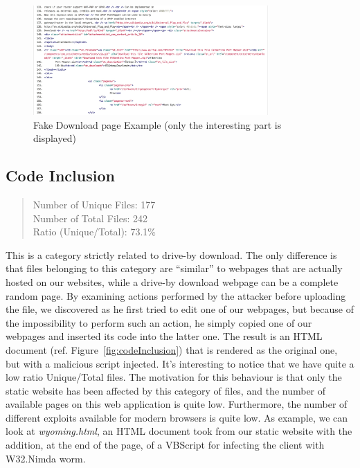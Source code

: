 \begin{figure}[H]
\centerline{\includegraphics[width=0.8\textwidth]{Images/fakeDownload.jpg}}
\caption{Fake Download page Example (only the interesting part is displayed)\label{fig:fakeDownload}}
\end{figure}

\subsection{Code Inclusion}

\begin{quote}
Number of Unique Files: 177\\
Number of Total Files: 242\\
Ratio (Unique/Total): 73.1\%
\end{quote}

This is a category strictly related to drive-by download. The only difference is that files belonging to this category are ``similar'' to webpages that are actually hosted on our websites, while a drive-by download webpage can be a complete random page. By examining actions performed by the attacker before uploading the file, we discovered as he first tried to edit one of our webpages, but because of the impossibility to perform such an action, he simply copied one of our webpages and inserted its code into the latter one. The result is an HTML document (ref. Figure~\ref{fig:codeInclusion}) that is rendered as the original one, but with a malicious script injected. It's interesting to notice that we have quite a low ratio Unique/Total files. The motivation for this behaviour is that only the static website has been affected by this category of files, and the number of available pages on this web application is quite low. Furthermore, the number of different exploits available for modern browsers is quite low.
As example, we can look at \emph{wyoming.html}, an HTML document took from our static website with the addition, at the end of the page, of a VBScript for infecting the client with W32.Nimda worm.

